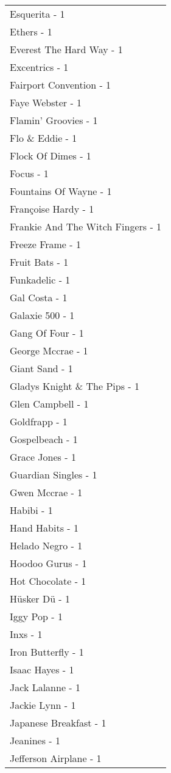 \documentclass[
]{article}
\begin{document}
\begin{longtable}{l}
Esquerita - 1 \\ 
Ethers - 1 \\ 
Everest The Hard Way - 1 \\ 
Excentrics - 1 \\ 
Fairport Convention - 1 \\ 
Faye Webster - 1 \\ 
Flamin' Groovies - 1 \\ 
Flo \& Eddie - 1 \\ 
Flock Of Dimes - 1 \\ 
Focus - 1 \\ 
Fountains Of Wayne - 1 \\ 
Françoise Hardy - 1 \\ 
Frankie And The Witch Fingers - 1 \\ 
Freeze Frame - 1 \\ 
Fruit Bats - 1 \\ 
Funkadelic - 1 \\ 
Gal Costa - 1 \\ 
Galaxie 500 - 1 \\ 
Gang Of Four - 1 \\ 
George Mccrae - 1 \\ 
Giant Sand - 1 \\ 
Gladys Knight \& The Pips - 1 \\ 
Glen Campbell - 1 \\ 
Goldfrapp - 1 \\ 
Gospelbeach - 1 \\ 
Grace Jones - 1 \\ 
Guardian Singles - 1 \\ 
Gwen Mccrae - 1 \\ 
Habibi - 1 \\ 
Hand Habits - 1 \\ 
Helado Negro - 1 \\ 
Hoodoo Gurus - 1 \\ 
Hot Chocolate - 1 \\ 
Hüsker Dü - 1 \\ 
Iggy Pop - 1 \\ 
Inxs - 1 \\ 
Iron Butterfly - 1 \\ 
Isaac Hayes - 1 \\ 
Jack Lalanne - 1 \\ 
Jackie Lynn - 1 \\ 
Japanese Breakfast - 1 \\ 
Jeanines - 1 \\ 
Jefferson Airplane - 1 \\ 

\end{longtable}
\end{document}
